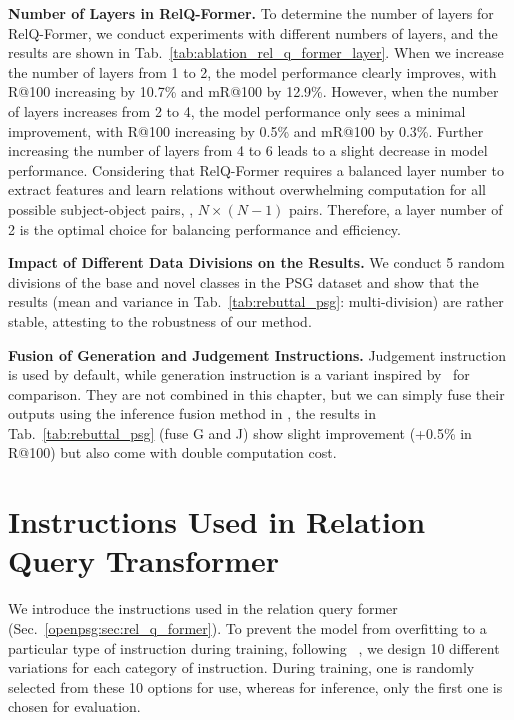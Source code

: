 \noindent \textbf{Number of Layers in RelQ-Former.}
To determine the number of layers for RelQ-Former, we conduct experiments with different numbers of layers, and the results are shown in Tab.~\ref{tab:ablation_rel_q_former_layer}.
When we increase the number of layers from 1 to 2, the model performance clearly improves, with R@100 increasing by 10.7\% and mR@100 by 12.9\%.
However, when the number of layers increases from 2 to 4, the model performance only sees a minimal improvement, with R@100 increasing by 0.5\% and mR@100 by 0.3\%.
Further increasing the number of layers from 4 to 6 leads to a slight decrease in model performance.
Considering that RelQ-Former requires a balanced layer number to extract features and learn relations without overwhelming computation for all possible subject-object pairs, \ie, $N \times (N-1)$ pairs.
Therefore, a layer number of 2 is the optimal choice for balancing performance and efficiency.



\noindent \textbf{Impact of Different Data Divisions on the Results.}
We conduct 5 random divisions of the base and novel classes in the PSG dataset and show that the results (mean and variance in Tab.~\ref{tab:rebuttal_psg}: multi-division) are rather stable, attesting to the robustness of our method.

\noindent \textbf{Fusion of Generation and Judgement Instructions.}
Judgement instruction is used by default, while generation instruction is a variant inspired by~\citep{zhang2023simple} for comparison.
They are not combined in this chapter, but we can simply fuse their outputs using the inference fusion method in \citep{zhou2023hilo, zhou2025vlprompt}, the results in Tab.~\ref{tab:rebuttal_psg} (fuse G and J) show slight improvement (+0.5\% in R@100) but also come with double computation cost.


\section{Instructions Used in Relation Query Transformer}
\label{sec:instruction_rel_q_former}
We introduce the instructions used in the relation query former (Sec.~\ref{openpsg:sec:rel_q_former}).
To prevent the model from overfitting to a particular type of instruction during training, following ~\citep{liu2024visual, dai2024instructblip, yu2023towards}, we design 10 different variations for each category of instruction.
During training, one is randomly selected from these 10 options for use, whereas for inference, only the first one is chosen for evaluation.

